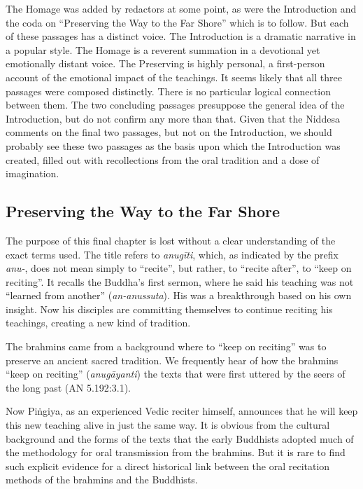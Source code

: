 \documentclass[12pt,openany]{book}%
\begin{document}
The Homage was added by redactors at some point, as were the Introduction and the coda on “Preserving the Way to the Far Shore” which is to follow. But each of these passages has a distinct voice. The Introduction is a dramatic narrative in a popular style. The Homage is a reverent summation in a devotional yet emotionally distant voice. The Preserving is highly personal, a first-person account of the emotional impact of the teachings. It seems likely that all three passages were composed distinctly. There is no particular logical connection between them. The two concluding passages presuppose the general idea of the Introduction, but do not confirm any more than that. Given that the Niddesa comments on the final two passages, but not on the Introduction, we should probably see these two passages as the basis upon which the Introduction was created, filled out with recollections from the oral tradition and a dose of imagination.

\subsection*{Preserving the Way to the Far Shore}

The purpose of this final chapter is lost without a clear understanding of the exact terms used. The title refers to \textit{\textsanskrit{anugīti}}, which, as indicated by the prefix \textit{anu-}, does not mean simply to “recite”, but rather, to “recite after”, to “keep on reciting”. It recalls the Buddha’s first sermon, where he said his teaching was not “learned from another” (\textit{an-anussuta}). His was a breakthrough based on his own insight. Now his disciples are committing themselves to continue reciting his teachings, creating a new kind of tradition.

The brahmins came from a background where to “keep on reciting” was to preserve an ancient sacred tradition. We frequently hear of how the brahmins “keep on reciting” (\textit{\textsanskrit{anugāyanti}}) the texts that were first uttered by the seers of the long past (AN 5.192:3.1).

Now \textsanskrit{Piṅgiya}, as an experienced Vedic reciter himself, announces that he will keep this new teaching alive in just the same way. It is obvious from the cultural background and the forms of the texts that the early Buddhists adopted much of the methodology for oral transmission from the brahmins. But it is rare to find such explicit evidence for a direct historical link between the oral recitation methods of the brahmins and the Buddhists.
\end{document}
